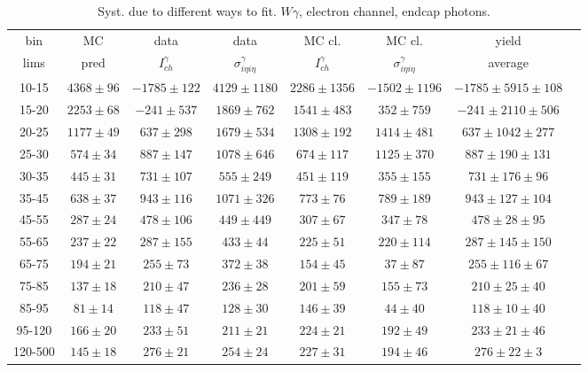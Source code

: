\begin{table}[h]
  \tiny
  \begin{center}
  \caption{Syst. due to different ways to fit. $W\gamma$, electron channel, endcap photons.}
  \begin{tabular}{|c|c|c|c|c|c|c|c|}
    bin &  MC   & data  & data  & MC cl. & MC cl. & yield\\ 
    lims & pred & $I_{ch}^{\gamma}$ & $\sigma_{i\eta i\eta}^\gamma$  & $I_{ch}^{\gamma}$  & $\sigma_{i\eta i\eta}^\gamma$   & average \\ \hline
     10-15 & $4368\pm96$ & $-1785\pm122$ & $4129\pm1180$ & $2286\pm1356$ & $-1502\pm1196$ &$-1785\pm5915\pm108$  \\ \hline
    15-20 & $2253\pm68$ & $-241\pm537$ & $1869\pm762$ & $1541\pm483$ & $352\pm759$ &$-241\pm2110\pm506$  \\ \hline
    20-25 & $1177\pm49$ & $637\pm298$ & $1679\pm534$ & $1308\pm192$ & $1414\pm481$ &$637\pm1042\pm277$  \\ \hline
    25-30 & $574\pm34$ & $887\pm147$ & $1078\pm646$ & $674\pm117$ & $1125\pm370$ &$887\pm190\pm131$  \\ \hline
    30-35 & $445\pm31$ & $731\pm107$ & $555\pm249$ & $451\pm119$ & $355\pm155$ &$731\pm176\pm96$  \\ \hline
    35-45 & $638\pm37$ & $943\pm116$ & $1071\pm326$ & $773\pm76$ & $789\pm189$ &$943\pm127\pm104$  \\ \hline
    45-55 & $287\pm24$ & $478\pm106$ & $449\pm449$ & $307\pm67$ & $347\pm78$ &$478\pm28\pm95$  \\ \hline
    55-65 & $237\pm22$ & $287\pm155$ & $433\pm44$ & $225\pm51$ & $220\pm114$ &$287\pm145\pm150$  \\ \hline
    65-75 & $194\pm21$ & $255\pm73$ & $372\pm38$ & $154\pm45$ & $37\pm87$ &$255\pm116\pm67$  \\ \hline
    75-85 & $137\pm18$ & $210\pm47$ & $236\pm28$ & $201\pm59$ & $155\pm73$ &$210\pm25\pm40$  \\ \hline
    85-95 & $81\pm14$ & $118\pm47$ & $128\pm30$ & $146\pm39$ & $44\pm40$ &$118\pm10\pm40$  \\ \hline
    95-120 & $166\pm20$ & $233\pm51$ & $211\pm21$ & $224\pm21$ & $192\pm49$ &$233\pm21\pm46$  \\ \hline
    120-500 & $145\pm18$ & $276\pm21$ & $254\pm24$ & $227\pm31$ & $194\pm46$ &$276\pm22\pm3$  \\ \hline
  \end{tabular}
  \label{tab:diff_ways_to_fit_phoEt_ENDCAP_electron}
  \end{center}
\end{table}


